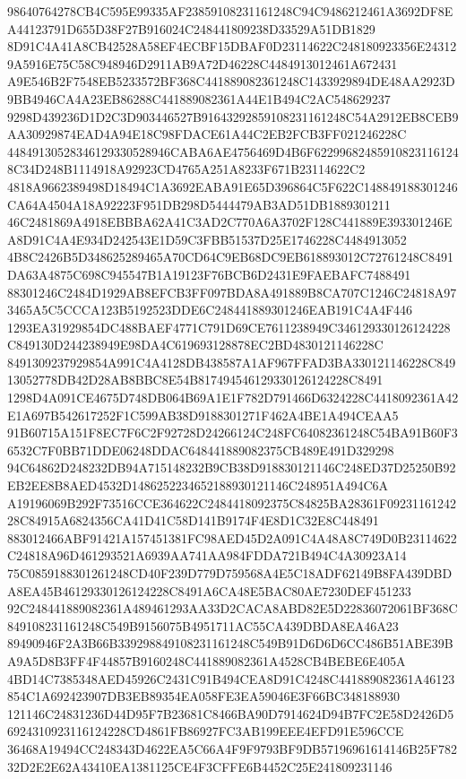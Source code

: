 \documentclass[UTF8,fontset=fandol,zihao=-4,a4paper]{ctexart}
\begin{document}
{{98640764278CB4C595E99335AF23859108231161248C94C9486212461A3692DF8EA44123791D655D38F27B916024C248441809238D33529A51DB1829
8D91C4A41A8CB42528A58EF4ECBF15DBAF0D23114622C248180923356E243129A5916E75C58C948946D2911AB9A72D46228C4484913012461A672431
A9E546B2F7548EB5233572BF368C441889082361248C1433929894DE48AA2923D9BB4946CA4A23EB86288C441889082361A44E1B494C2AC548629237
9298D439236D1D2C3D903446527B91643292859108231161248C54A2912EB8CEB9AA30929874EAD4A94E18C98FDACE61A44C2EB2FCB3FF021246228C
44849130528346129330528946CABA6AE4756469D4B6F622996824859108231161248C34D248B1114918A92923CD4765A251A8233F671B23114622C2
4818A9662389498D18494C1A3692EABA91E65D396864C5F622C148849188301246CA64A4504A18A92223F951DB298D5444479AB3AD51DB1889301211
46C2481869A4918EBBBA62A41C3AD2C770A6A3702F128C441889E393301246EA8D91C4A4E934D242543E1D59C3FBB51537D25E1746228C4484913052
4B8C2426B5D348625289465A70CD64C9EB68DC9EB618893012C72761248C8491DA63A4875C698C945547B1A19123F76BCB6D2431E9FAEBAFC7488491
88301246C2484D1929AB8EFCB3FF097BDA8A491889B8CA707C1246C24818A973465A5C5CCCA123B5192523DDE6C248441889301246EAB191C4A4F446
1293EA31929854DC488BAEF4771C791D69CE7611238949C346129330126124228C849130D244238949E98DA4C619693128878EC2BD4830121146228C
8491309237929854A991C4A4128DB438587A1AF967FFAD3BA330121146228C84913052778DB42D28AB8BBC8E54B817494546129330126124228C8491
1298D4A091CE4675D748DB064B69A1E1F782D791466D6324228C4418092361A42E1A697B542617252F1C599AB38D9188301271F462A4BE1A494CEAA5
91B60715A151F8EC7F6C2F92728D24266124C248FC64082361248C54BA91B60F36532C7F0BB71DDE06248DDAC648441889082375CB489E491D329298
94C64862D248232DB94A715148232B9CB38D918830121146C248ED37D25250B92EB2EE8B8AED4532D1486252234652188930121146C248951A494C6A
A19196069B292F73516CCE364622C2484418092375C84825BA28361F0923116124228C84915A6824356CA41D41C58D141B9174F4E8D1C32E8C448491
883012466ABF91421A157451381FC98AED45D2A091C4A48A8C749D0B23114622C24818A96D461293521A6939AA741AA984FDDA721B494C4A30923A14
75C0859188301261248CD40F239D779D759568A4E5C18ADF62149B8FA439DBDA8EA45B46129330126124228C8491A6CA48E5BAC80AE7230DEF451233
92C248441889082361A489461293AA33D2CACA8ABD82E5D22836072061BF368C849108231161248C549B9156075B4951711AC55CA439DBDA8EA46A23
89490946F2A3B66B339298849108231161248C549B91D6D6D6CC486B51ABE39BA9A5D8B3FF4F44857B9160248C441889082361A4528CB4BEBE6E405A
4BD14C7385348AED45926C2431C91B494CEA8D91C4248C441889082361A46123854C1A692423907DB3EB89354EA058FE3EA59046E3F66BC348188930
121146C24831236D44D95F7B23681C8466BA90D7914624D94B7FC2E58D2426D56924310923116124228CD4861FB86927FC3AB199EEE4EFD91E596CCE
36468A19494CC248343D4622EA5C66A4F9F9793BF9DB57196961614146B25F78232D2E2E62A43410EA1381125CE4F3CFFE6B4452C25E241809231146
}}
\end{document}
